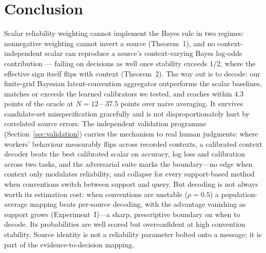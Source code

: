 \section{Conclusion}

Scalar reliability weighting cannot implement the Bayes rule in two
regimes: nonnegative weighting cannot invert a source (Theorem~1), and no
context-independent scalar can reproduce a source's context-varying
Bayes log-odds contribution --- failing on decisions as well once
stability exceeds $1/2$, where the effective sign itself flips with
context (Theorem~2). The way out is to decode: our
finite-grid Bayesian latent-convention aggregator outperforms the scalar
baselines, matches or exceeds the learned calibrators we tested, and
reaches within 4.3 points of the oracle at $N=12$---37.5 points over
naive averaging. It survives candidate-set misspecification gracefully
and is not disproportionately hurt by correlated source errors. The
independent validation programme (Section~\ref{sec:validation})
carries the mechanism to real human judgments: where workers'
behaviour measurably flips across recorded contexts, a calibrated
context decoder beats the best calibrated scalar on accuracy, log
loss and calibration across two tasks, and the adversarial suite
marks the boundary---no edge when context only modulates
reliability, and collapse for every support-based method when
conventions switch between support and query. But
decoding is not always worth its estimation cost: when conventions are
unstable ($\rho=0.5$) a population-average mapping beats per-source
decoding, with the advantage vanishing as support grows
(Experiment~I)---a sharp, prescriptive boundary on when to decode. Its
probabilities are well scored but overconfident at high convention
stability. Source
identity is not a reliability parameter bolted onto a message; it is part
of the evidence-to-decision mapping.
